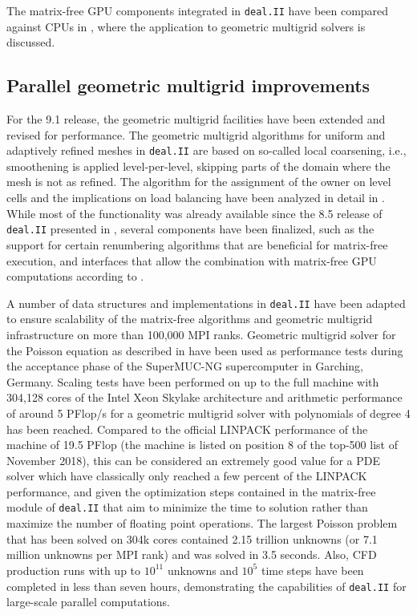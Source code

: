 \documentclass{ansarticle-preprint}
\newcommand{\specialword}[1]{\texttt{#1}}
\newcommand{\dealii}{{\specialword{deal.II}}\xspace}
\begin{document}
The matrix-free GPU components integrated in \dealii have been compared against
CPUs in \cite{KronbichlerLjungkvist2019}, where the application to geometric
multigrid solvers is discussed.

\subsection{Parallel geometric multigrid improvements}
\label{subsec:gmg}

For the 9.1 release, the geometric multigrid facilities have been extended and
revised for performance. The geometric multigrid algorithms for uniform and
adaptively refined meshes in \dealii are based on so-called local coarsening,
i.e., smoothening is applied level-per-level, skipping parts of the domain
where the mesh is not as refined. The algorithm for the assignment of the
owner on level cells and the implications on load balancing have been analyzed
in detail in \cite{ClevengerHeisterKanschatKronbichler2019}. While most of the
functionality was already available since the 8.5 release of \dealii presented
in \cite{dealII85}, several components have been finalized, such as the
support for certain renumbering algorithms that are beneficial for matrix-free
execution, and interfaces that allow the combination with matrix-free GPU
computations according to \cite{KronbichlerLjungkvist2019}.

A number of data structures and implementations in \dealii have been adapted
to ensure scalability of the matrix-free algorithms and geometric multigrid
infrastructure on more than 100,000 MPI ranks. Geometric multigrid solver for
the Poisson equation as described in \cite{KronbichlerWall2018} have been used
as performance tests during the acceptance phase of the SuperMUC-NG
supercomputer in Garching, Germany. Scaling tests have been performed on up to
the full machine with 304,128 cores of the Intel Xeon Skylake architecture and
arithmetic performance of around 5 PFlop/s for a geometric multigrid solver
with polynomials of degree 4 has been reached. Compared to the official
LINPACK performance of the machine of 19.5 PFlop (the machine is listed on
position 8 of the top-500 list of November 2018), this can be considered an
extremely good value for a PDE solver which have classically only reached a
few percent of the LINPACK performance, and given the optimization steps
contained in the matrix-free module of \dealii that aim to minimize the time
to solution rather than maximize the number of floating point operations. The
largest Poisson problem that has been solved on 304k cores contained 2.15
trillion unknowns (or 7.1 million unknowns per MPI rank) and was solved in 3.5
seconds. Also, CFD production runs with up to $10^{11}$ unknowns and $10^5$
time steps have been completed in less than seven hours, demonstrating the
capabilities of \dealii for large-scale parallel computations.
\end{document}

